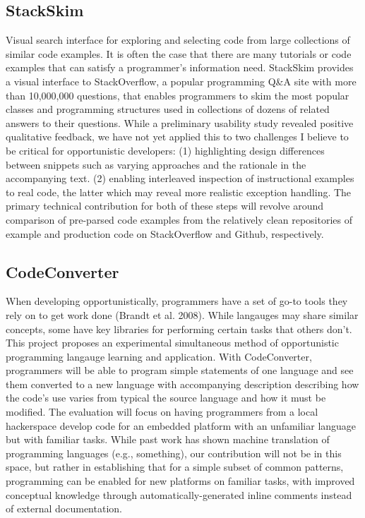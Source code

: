 \documentclass[12pt]{memoir}
\begin{document}
\subsection{StackSkim}
Visual search interface for exploring and selecting code from large collections of similar code examples.
It is often the case that there are many tutorials or code examples that can satisfy a programmer's information need.
StackSkim provides a visual interface to StackOverflow, a popular programming Q\&A site with more than 10,000,000 questions, that enables programmers to skim the most popular classes and programming structures used in collections of dozens of related answers to their questions.
While a preliminary usability study revealed positive qualitative feedback, we have not yet applied this to two challenges I believe to be critical for opportunistic developers: (1) highlighting design differences between snippets such as varying approaches and the rationale in the accompanying text. (2) enabling interleaved inspection of instructional examples to real code, the latter which may reveal more realistic exception handling.
The primary technical contribution for both of these steps will revolve around comparison of pre-parsed code examples from the relatively clean repositories of example and production code on StackOverflow and Github, respectively.

\subsection{CodeConverter}
When developing opportunistically, programmers have a set of go-to tools they rely on to get work done (Brandt et al. 2008).
While langauges may share similar concepts, some have key libraries for performing certain tasks that others don't.
This project proposes an experimental simultaneous method of opportunistic programming langauge learning and application.
With CodeConverter, programmers will be able to program simple statements of one language and see them converted to a new language with accompanying description describing how the code's use varies from typical the source language and how it must be modified.
The evaluation will focus on having programmers from a local hackerspace develop code for an embedded platform with an unfamiliar language but with familiar tasks.
While past work has shown machine translation of programming languages (e.g., something), our contribution will not be in this space, but rather in establishing that for a simple subset of common patterns, programming can be enabled for new platforms on familiar tasks, with improved conceptual knowledge through automatically-generated inline comments instead of external documentation.
\end{document}
